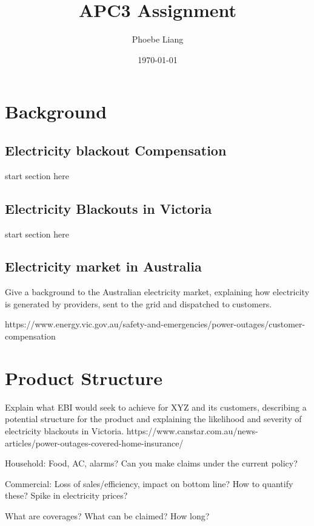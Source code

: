 \documentclass[12pt]{article}
\title{APC3 Assignment}
\author{Phoebe Liang}
\date{\today}
\begin{document}
\maketitle

\tableofcontents
\clearpage

\section{Background}
\subsection{Electricity blackout Compensation}
\begin{flushleft}
start section here
\end{flushleft}

\subsection{Electricity Blackouts in Victoria}
\begin{flushleft}
start section here
\end{flushleft}

\subsection{Electricity market in Australia}
\begin{flushleft}
Give a background to the Australian electricity market, explaining how electricity is generated by providers, sent to the grid and dispatched to customers. \par
https://www.energy.vic.gov.au/safety-and-emergencies/power-outages/customer-compensation 
\end{flushleft}


\newpage


\section{Product Structure}
\begin{flushleft}
Explain what EBI would seek to achieve for XYZ and its customers, describing a potential 
structure for the product and explaining the likelihood and severity of electricity blackouts in Victoria.
https://www.canstar.com.au/news-articles/power-outages-covered-home-insurance/ \par
Household: Food, AC, alarms? Can you make claims under the current policy? \par
Commercial: Loss of sales/efficiency, impact on bottom line? How to quantify these? Spike in electricity prices?\par
What are coverages? What can be claimed? How long?  
\end{flushleft}
\end{document}
